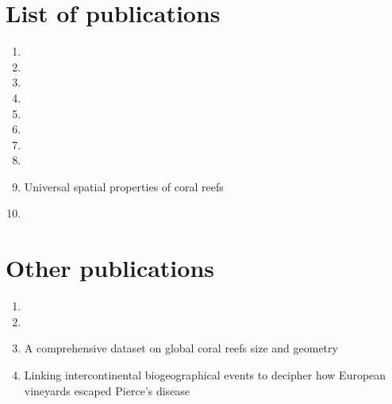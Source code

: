 \documentclass[
	10pt, %
	a4paper, %
]{LegrandOrangeBook}
\begin{document}
\chapter*{List of publications}

\begin{enumerate}
	\item {}
	      \vspace{0.5 cm}
	\item {}
	      \vspace{0.5 cm}
	\item {}
	      \vspace{0.5 cm}
	\item {}
	      \vspace{0.5 cm}
	\item {}
	      \vspace{0.5 cm}
	\item {}
	      \vspace{0.5 cm}
	\item {}
	      \vspace{0.5 cm}
	\item {}
	      \vspace{0.5 cm}
	\item Universal spatial properties of coral reefs
	      \vspace{0.5cm}
	\item {}
\end{enumerate}

\chapter*{Other publications}

\begin{enumerate}
	\item {}
	      \vspace{0.5 cm}
	\item {}
	      \vspace{0.5 cm}
	\item A comprehensive dataset on global coral reefs size and
	      geometry
	      \vspace{0.5 cm}
	\item Linking intercontinental biogeographical events to decipher how
	      European vineyards escaped Pierce's disease
	      \vspace{0.5 cm}

\end{enumerate}
\end{document}
